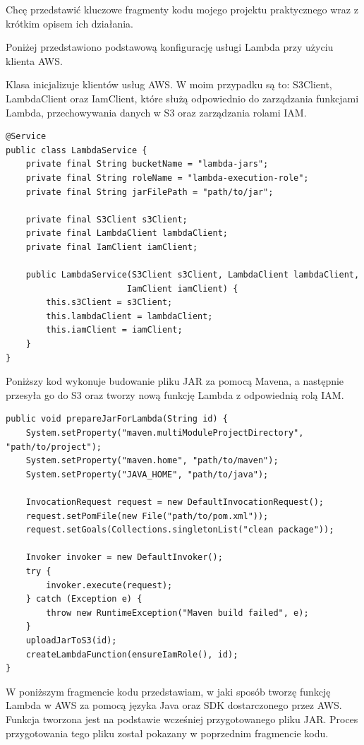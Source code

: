\documentclass[runningheads,12pt]{llncs}
\begin{document}
Chcę przedstawić kluczowe fragmenty kodu mojego projektu praktycznego wraz z krótkim opisem ich działania.

Poniżej przedstawiono podstawową konfigurację usługi Lambda przy użyciu klienta AWS.

Klasa inicjalizuje klientów usług AWS. W moim przypadku są to: S3Client, LambdaClient oraz IamClient, które służą odpowiednio do zarządzania funkcjami Lambda, przechowywania danych w S3 oraz zarządzania rolami IAM.

\begin{verbatim}
@Service
public class LambdaService {
    private final String bucketName = "lambda-jars";
    private final String roleName = "lambda-execution-role";
    private final String jarFilePath = "path/to/jar";

    private final S3Client s3Client;
    private final LambdaClient lambdaClient;
    private final IamClient iamClient;

    public LambdaService(S3Client s3Client, LambdaClient lambdaClient, 
                        IamClient iamClient) {
        this.s3Client = s3Client;
        this.lambdaClient = lambdaClient;
        this.iamClient = iamClient;
    }
}
\end{verbatim}

Poniższy kod wykonuje budowanie pliku JAR za pomocą Mavena, a następnie przesyła go do S3 oraz tworzy nową funkcję Lambda z odpowiednią rolą IAM.

\begin{verbatim}
public void prepareJarForLambda(String id) {
    System.setProperty("maven.multiModuleProjectDirectory", "path/to/project");
    System.setProperty("maven.home", "path/to/maven");
    System.setProperty("JAVA_HOME", "path/to/java");

    InvocationRequest request = new DefaultInvocationRequest();
    request.setPomFile(new File("path/to/pom.xml"));
    request.setGoals(Collections.singletonList("clean package"));

    Invoker invoker = new DefaultInvoker();
    try {
        invoker.execute(request);
    } catch (Exception e) {
        throw new RuntimeException("Maven build failed", e);
    }
    uploadJarToS3(id);
    createLambdaFunction(ensureIamRole(), id);
}
\end{verbatim}

W poniższym fragmencie kodu przedstawiam, w jaki sposób tworzę funkcję Lambda w AWS za pomocą języka Java oraz SDK dostarczonego przez AWS. Funkcja tworzona jest na podstawie wcześniej przygotowanego pliku JAR. Proces przygotowania tego pliku został pokazany w poprzednim fragmencie kodu.
\end{document}
